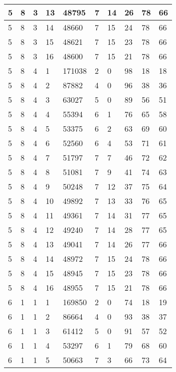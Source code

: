 \begin{table}[!ht]
\begin{tabular}{|l|l|l|l|l|l|l|l|l|l|}
        5 & 8 & 3 & 13 & 48795 & 7 & 14 & 26 & 78 & 66 \\ \hline
        5 & 8 & 3 & 14 & 48660 & 7 & 15 & 24 & 78 & 66 \\ \hline
        5 & 8 & 3 & 15 & 48621 & 7 & 15 & 23 & 78 & 66 \\ \hline
        5 & 8 & 3 & 16 & 48600 & 7 & 15 & 21 & 78 & 66 \\ \hline
        5 & 8 & 4 & 1 & 171038 & 2 & 0 & 98 & 18 & 18 \\ \hline
        5 & 8 & 4 & 2 & 87882 & 4 & 0 & 96 & 38 & 36 \\ \hline
        5 & 8 & 4 & 3 & 63027 & 5 & 0 & 89 & 56 & 51 \\ \hline
        5 & 8 & 4 & 4 & 55394 & 6 & 1 & 76 & 65 & 58 \\ \hline
        5 & 8 & 4 & 5 & 53375 & 6 & 2 & 63 & 69 & 60 \\ \hline
        5 & 8 & 4 & 6 & 52560 & 6 & 4 & 53 & 71 & 61 \\ \hline
        5 & 8 & 4 & 7 & 51797 & 7 & 7 & 46 & 72 & 62 \\ \hline
        5 & 8 & 4 & 8 & 51081 & 7 & 9 & 41 & 74 & 63 \\ \hline
        5 & 8 & 4 & 9 & 50248 & 7 & 12 & 37 & 75 & 64 \\ \hline
        5 & 8 & 4 & 10 & 49892 & 7 & 13 & 33 & 76 & 65 \\ \hline
        5 & 8 & 4 & 11 & 49361 & 7 & 14 & 31 & 77 & 65 \\ \hline
        5 & 8 & 4 & 12 & 49240 & 7 & 14 & 28 & 77 & 65 \\ \hline
        5 & 8 & 4 & 13 & 49041 & 7 & 14 & 26 & 77 & 66 \\ \hline
        5 & 8 & 4 & 14 & 48972 & 7 & 15 & 24 & 78 & 66 \\ \hline
        5 & 8 & 4 & 15 & 48945 & 7 & 15 & 23 & 78 & 66 \\ \hline
        5 & 8 & 4 & 16 & 48955 & 7 & 15 & 21 & 78 & 66 \\ \hline
        6 & 1 & 1 & 1 & 169850 & 2 & 0 & 74 & 18 & 19 \\ \hline
        6 & 1 & 1 & 2 & 86664 & 4 & 0 & 93 & 38 & 37 \\ \hline
        6 & 1 & 1 & 3 & 61412 & 5 & 0 & 91 & 57 & 52 \\ \hline
        6 & 1 & 1 & 4 & 53297 & 6 & 1 & 79 & 68 & 60 \\ \hline
        6 & 1 & 1 & 5 & 50663 & 7 & 3 & 66 & 73 & 64 \\ \hline

\end{tabular}
\end{table}
